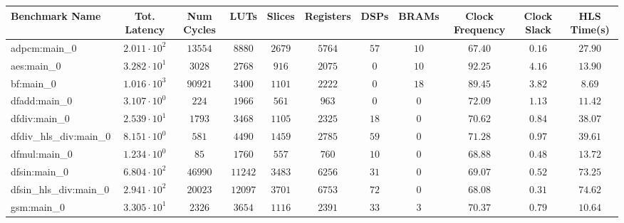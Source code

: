 \begin{tabular}{|l|c|c|c|c|c|c|c|c|c|c|}
\hline
Benchmark Name          & Tot. Latency           & Num Cycles & LUTs      & Slices    & Registers & DSPs    & BRAMs   & Clock Frequency & Clock Slack & HLS Time(s) \\
\hline
adpcm:main\_0           & $ 2.011 \cdot 10^{2} $ & $ 13554  $ & $ 8880  $ & $ 2679  $ & $ 5764  $ & $ 57  $ & $ 10  $ & $ 67.40       $ & $ 0.16    $ & $ 27.90   $ \\
aes:main\_0             & $ 3.282 \cdot 10^{1} $ & $ 3028   $ & $ 2768  $ & $ 916   $ & $ 2075  $ & $ 0   $ & $ 10  $ & $ 92.25       $ & $ 4.16    $ & $ 13.90   $ \\
bf:main\_0              & $ 1.016 \cdot 10^{3} $ & $ 90921  $ & $ 3400  $ & $ 1101  $ & $ 2222  $ & $ 0   $ & $ 18  $ & $ 89.45       $ & $ 3.82    $ & $ 8.69    $ \\
dfadd:main\_0           & $ 3.107 \cdot 10^{0} $ & $ 224    $ & $ 1966  $ & $ 561   $ & $ 963   $ & $ 0   $ & $ 0   $ & $ 72.09       $ & $ 1.13    $ & $ 11.42   $ \\
dfdiv:main\_0           & $ 2.539 \cdot 10^{1} $ & $ 1793   $ & $ 3468  $ & $ 1105  $ & $ 2325  $ & $ 18  $ & $ 0   $ & $ 70.62       $ & $ 0.84    $ & $ 38.07   $ \\
dfdiv\_hls\_div:main\_0 & $ 8.151 \cdot 10^{0} $ & $ 581    $ & $ 4490  $ & $ 1459  $ & $ 2785  $ & $ 59  $ & $ 0   $ & $ 71.28       $ & $ 0.97    $ & $ 39.61   $ \\
dfmul:main\_0           & $ 1.234 \cdot 10^{0} $ & $ 85     $ & $ 1760  $ & $ 557   $ & $ 760   $ & $ 10  $ & $ 0   $ & $ 68.88       $ & $ 0.48    $ & $ 13.72   $ \\
dfsin:main\_0           & $ 6.804 \cdot 10^{2} $ & $ 46990  $ & $ 11242 $ & $ 3483  $ & $ 6256  $ & $ 31  $ & $ 0   $ & $ 69.07       $ & $ 0.52    $ & $ 73.25   $ \\
dfsin\_hls\_div:main\_0 & $ 2.941 \cdot 10^{2} $ & $ 20023  $ & $ 12097 $ & $ 3701  $ & $ 6753  $ & $ 72  $ & $ 0   $ & $ 68.08       $ & $ 0.31    $ & $ 74.62   $ \\
gsm:main\_0             & $ 3.305 \cdot 10^{1} $ & $ 2326   $ & $ 3654  $ & $ 1116  $ & $ 2391  $ & $ 33  $ & $ 3   $ & $ 70.37       $ & $ 0.79    $ & $ 10.64   $ \\

\end{tabular}
